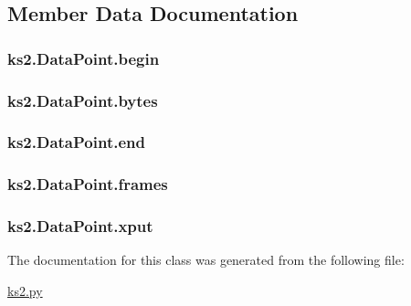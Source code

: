 \subsection{Member Data Documentation}
\hypertarget{classks2_1_1_data_point_a5109060f0ce2171d154560ae1f7ea618}{
\subsubsection[{begin}]{\setlength{\rightskip}{0pt plus 5cm}ks2.\-Data\-Point.\-begin}}\label{classks2_1_1_data_point_a5109060f0ce2171d154560ae1f7ea618}
\hypertarget{classks2_1_1_data_point_ad5e6469cea32af6efb8803f300bb9dee}{
\subsubsection[{bytes}]{\setlength{\rightskip}{0pt plus 5cm}ks2.\-Data\-Point.\-bytes}}\label{classks2_1_1_data_point_ad5e6469cea32af6efb8803f300bb9dee}
\hypertarget{classks2_1_1_data_point_a4898a56ed7246eb33a295da6496566d6}{
\subsubsection[{end}]{\setlength{\rightskip}{0pt plus 5cm}ks2.\-Data\-Point.\-end}}\label{classks2_1_1_data_point_a4898a56ed7246eb33a295da6496566d6}
\hypertarget{classks2_1_1_data_point_a214dead1966be1f38aa5bb5858ba8bf6}{
\subsubsection[{frames}]{\setlength{\rightskip}{0pt plus 5cm}ks2.\-Data\-Point.\-frames}}\label{classks2_1_1_data_point_a214dead1966be1f38aa5bb5858ba8bf6}
\hypertarget{classks2_1_1_data_point_a129a9557c8d54633b893753d8e272423}{
\subsubsection[{xput}]{\setlength{\rightskip}{0pt plus 5cm}ks2.\-Data\-Point.\-xput}}\label{classks2_1_1_data_point_a129a9557c8d54633b893753d8e272423}


The documentation for this class was generated from the following file\-:\begin{DoxyCompactItemize}
\item 
\hyperlink{ks2_8py}{ks2.\-py}\end{DoxyCompactItemize}
